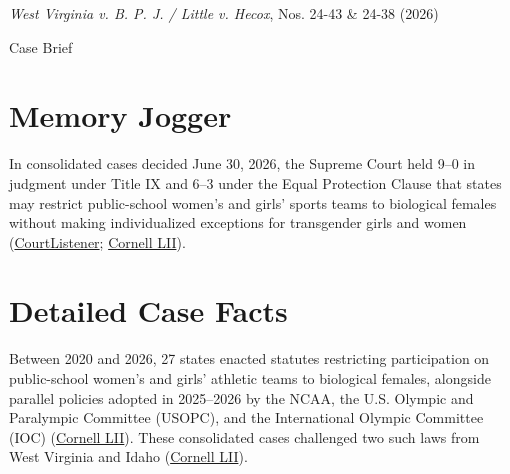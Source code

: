 \documentclass[12pt]{article}
\begin{document}
\begin{center}
{\LARGE \textit{West Virginia v. B. P. J. / Little v. Hecox}, Nos. 24-43 \& 24-38 (2026)\par}
\vspace{0.8em}
{\large Case Brief\par}
\end{center}
\vspace{1em}

\section{Memory Jogger}

In consolidated cases decided June 30, 2026, the Supreme Court held 9--0 in judgment under Title IX and 6--3 under the Equal Protection Clause that states may restrict public-school women's and girls' sports teams to biological females without making individualized exceptions for transgender girls and women (\href{https://www.courtlistener.com/opinion/10882186/west-virginia-v-b-p-j/}{CourtListener}; \href{https://www.law.cornell.edu/supremecourt/text/24-43}{Cornell LII}).

\section{Detailed Case Facts}

Between 2020 and 2026, 27 states enacted statutes restricting participation on public-school women's and girls' athletic teams to biological females, alongside parallel policies adopted in 2025--2026 by the NCAA, the U.S. Olympic and Paralympic Committee (USOPC), and the International Olympic Committee (IOC) (\href{https://www.law.cornell.edu/supremecourt/text/24-43}{Cornell LII}). These consolidated cases challenged two such laws from West Virginia and Idaho (\href{https://www.law.cornell.edu/supremecourt/text/24-43}{Cornell LII}).
\end{document}
